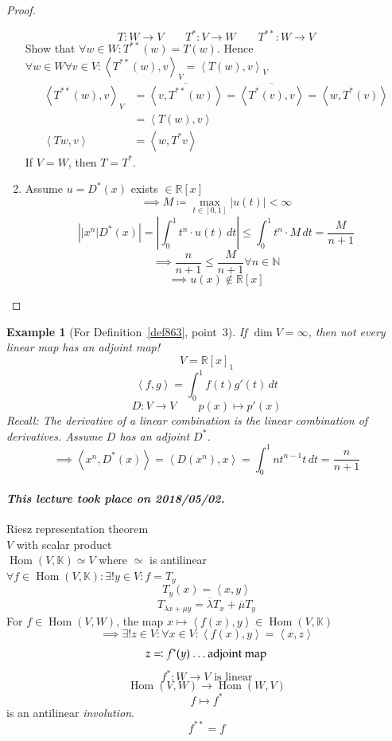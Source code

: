 \documentclass{article}
\newtheorem{example}{Example}  \numberwithin{example}{section}
\newcommand{\ip}[2]{\left\langle#1,#2\right\rangle} %
\newcommand{\card}[1]{\left|#1\right|}
\newcommand{\dateref}[1]{\paragraph{\textit{This lecture took place on #1.}}}
\begin{document}
\begin{proof}
\begin{enumerate}
      \[ T: W \to V \qquad T^*: V \to W \qquad T^{**}: W \to V \]
      Show that $\forall w \in W: T^{**}(w) = T(w)$. Hence $\forall w \in W \forall v \in V: \ip{T^{**}(w)}{v}_V = \ip{T(w)}{v}_V$
      \begin{align*}
        \ip{T^{**}(w)}{v}_V &= \overline{\ip{v}{T^{**}(w)}} = \overline{\ip{T^*(v)}{v}} = \ip{w}{T^*(v)} \\
          &= \ip{T(w)}{v} \\
        \ip{Tw}{v} &= \ip{w}{T^*v}
      \end{align*}
      If $V = W$, then $T = T^*$.
    \item Assume $u = D^*(x)$ exists $\in \mathbb R[x]$ \\
      \[ \implies M \coloneqq \max_{t \in [0,1]} \card{u(t)} < \infty \]
      \[ \card{\card{x^n}{D^*(x)}} = \card{\int_0^1 t^n \cdot u(t) \, dt} \leq \int_0^1 t^n \cdot M \, dt = \frac{M}{n+1} \]
      \[ \implies \frac{n}{n+1} \leq \frac{M}{n+1} \forall n \in \mathbb N \]
      \[ \implies u(x) \not\in \mathbb R[x] \]
  \end{enumerate}
\end{proof}

\begin{example}[For Definition~\ref{def863}, point~3] %
  If $\dim{V} = \infty$, then not every linear map has an adjoint map!
  \[ V = \mathbb R[x]_1 \]
  \[ \ip{f}{g} = \int_0^1 f(t) g'(t) \, dt \]
  \[ D: V \to V \qquad p(x) \mapsto p'(x) \]
  Recall: The derivative of a linear combination is the linear combination of derivatives.
  Assume $D$ has an adjoint $D^*$.
  \[ \implies \ip{x^n}{D^*(x)} = \ip{D(x^n)}{x} = \int_0^1 n t^{n-1} t \, dt = \frac{n}{n+1} \]
\end{example}

\dateref{2018/05/02}

Riesz representation theorem \\
$V$ with scalar product \\
$\operatorname{Hom}(V, \mathbb K) \simeq V$ where $\simeq$ is antilinear \\
$\forall f \in \operatorname{Hom}(V, \mathbb K): \exists! y \in V: f = T_y$ \\
\[ T_y(x) = \ip xy \]
\[ T_{\lambda x + \mu y} = \overline{\lambda} T_x + \overline\mu T_y \]
For $f \in \operatorname{Hom}(V, W)$, the map $x \mapsto \ip{f(x)}{y} \in \operatorname{Hom}(V, \mathbb K)$
\[ \implies \exists! z \in V: \forall x \in V: \ip{f(x)}{y} = \ip xz \]
\[ z \eqqcolon f^*(y) \text{ \dots adjoint map} \]
\[ f^*: W \to V \text{ is linear} \]
\[ \operatorname{Hom}(V, W) \to \operatorname{Hom}(W, V) \]
\[ f \mapsto f^* \]
is an antilinear \emph{involution}.
\[ f^{**} = f \]
\end{document}
